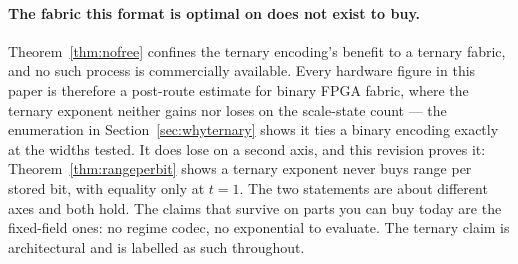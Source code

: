\paragraph{The fabric this format is optimal on does not exist to buy.}
Theorem~\ref{thm:nofree} confines the ternary encoding's benefit to a ternary
fabric, and no such process is commercially available. Every hardware figure in
this paper is therefore a post-route estimate for binary FPGA fabric, where the
ternary exponent neither gains nor loses on the scale-state count --- the
enumeration in Section~\ref{sec:whyternary} shows it ties a binary encoding
exactly at the widths tested. It does lose on a second axis, and this revision
proves it: Theorem~\ref{thm:rangeperbit} shows a ternary exponent never buys range
per stored bit, with equality only at $t=1$. The two statements are about
different axes and both hold. The claims that survive on parts you can buy today are the fixed-field
ones: no regime codec, no exponential to
evaluate. The ternary claim is architectural and is labelled as such throughout.

